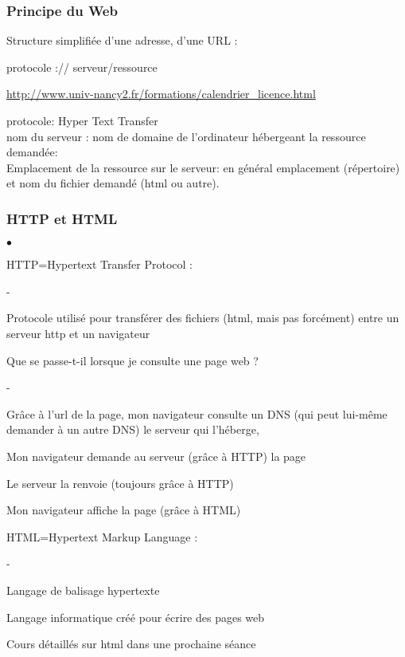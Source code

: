 \documentclass[10pt,dvipsnames, dvips, svgnames]{article}
\begin{document}
\subsubsection{Principe du Web}

Structure simplifiée d’une adresse, d’une URL :

protocole :// serveur/ressource


\url{http://www.univ-nancy2.fr/formations/calendrier_licence.html}

protocole: Hyper Text Transfer\\
nom du serveur : nom de domaine de l'ordinateur hébergeant la ressource demandée:  \\
Emplacement de la ressource sur le serveur:  en général emplacement (répertoire) et nom du fichier demandé (html ou autre).




\newpage
\subsubsection{HTTP et HTML}

\begin{list}{$\bullet$}{}
\item HTTP=Hypertext Transfer Protocol :
	\begin{list}{-}{}
	\item Protocole utilisé pour transférer des fichiers (html, mais pas forcément) entre un serveur http et un navigateur
	\end{list}
\item Que se passe-t-il lorsque je consulte une page web ?
	\begin{list}{-}{}
	\item Grâce à l’url de la page, mon navigateur consulte un DNS (qui peut lui-même demander à un autre DNS) le serveur qui l’héberge,
	\item Mon navigateur demande au serveur (grâce à HTTP) la page 
	\item Le serveur la renvoie (toujours grâce à HTTP)
	\item Mon navigateur affiche la page (grâce à HTML)
	\end{list}
\item HTML=Hypertext Markup Language :
	\begin{list}{-}{}
	\item Langage de balisage hypertexte
	\item Langage informatique créé pour écrire des pages web
	\item Cours détaillés sur html dans une prochaine séance
	\end{list}
\end{list}
\end{document}

